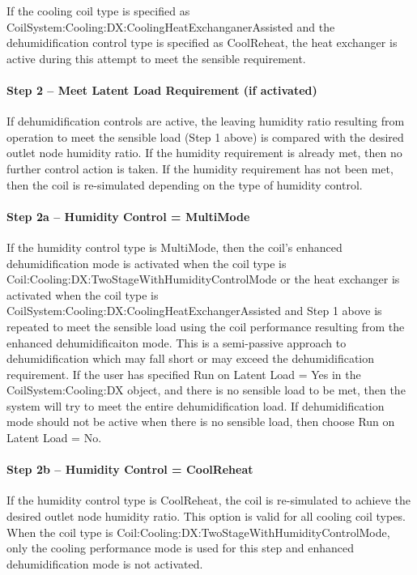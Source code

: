 If the cooling coil type is specified as CoilSystem:Cooling:DX:CoolingHeatExchanganerAssisted and the dehumidification control type is specified as CoolReheat, the heat exchanger is active during this attempt to meet the sensible requirement.

\paragraph{Step 2 -- Meet Latent Load Requirement (if activated)}\label{step-2-meet-latent-load-requirement-if-activated-1}

If dehumidification controls are active, the leaving humidity ratio resulting from operation to meet the sensible load (Step 1 above) is compared with the desired outlet node humidity ratio. If the humidity requirement is already met, then no further control action is taken. If the humidity requirement has not been met, then the coil is re-simulated depending on the type of humidity control.

\paragraph{Step 2a -- Humidity Control = MultiMode}\label{step-2a-humidity-control-multimode-1}

If the humidity control type is MultiMode, then the coil's enhanced dehumidification mode is activated when the coil type is Coil:Cooling:DX:TwoStageWithHumidityControlMode or the heat exchanger is activated when the coil type is \\
CoilSystem:Cooling:DX:CoolingHeatExchangerAssisted and Step 1 above is repeated to meet the sensible load using the coil performance resulting from the enhanced dehumidificaiton mode. This is a semi-passive approach to dehumidification which may fall short or may exceed the dehumidification requirement. If the user has specified Run on Latent Load = Yes in the CoilSystem:Cooling:DX object, and there is no sensible load to be met, then the system will try to meet the entire dehumidification load. If dehumidification mode should not be active when there is no sensible load, then choose Run on Latent Load = No.

\paragraph{Step 2b -- Humidity Control = CoolReheat}\label{step-2b-humidity-control-coolreheat-1}

If the humidity control type is CoolReheat, the coil is re-simulated to achieve the desired outlet node humidity ratio. This option is valid for all cooling coil types. When the coil type is Coil:Cooling:DX:TwoStageWithHumidityControlMode, only the cooling performance mode is used for this step and enhanced dehumidification mode is not activated.

